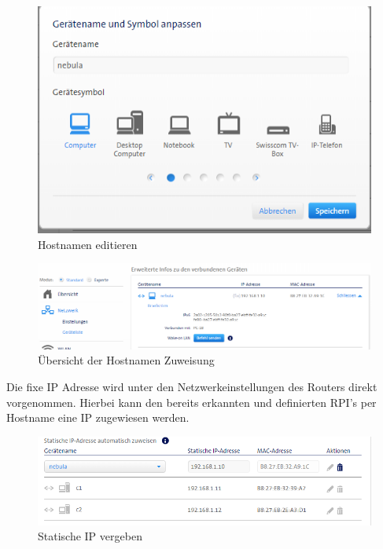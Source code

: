 \begin{figure}[H]
	\centering
	\includegraphics[scale=0.8]{Bilder/hostnamen_mac_edit.png}
	\caption{Hostnamen editieren}
\end{figure}
\begin{figure}[H]
	\centering
	\includegraphics[scale=0.6]{Bilder/hostnamen_mac_overview.png}
	\caption{Übersicht der Hostnamen Zuweisung}
\end{figure}

Die fixe IP Adresse wird unter den Netzwerkeinstellungen des Routers direkt vorgenommen. Hierbei kann den bereits erkannten und definierten RPI's per Hostname eine IP zugewiesen werden.
\begin{figure}[H]
	\centering
	\includegraphics[scale=0.8]{Bilder/ip_mac_edit.png}
	\caption{Statische IP vergeben}
\end{figure}